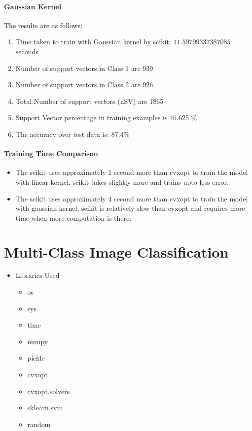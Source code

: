 \documentclass[11pt]{article}
\begin{document}
\paragraph{Gaussian Kernel}
The results are as follows:
\begin{enumerate}
  \item Time taken to train with Gaussian kernel by scikit:  $11.59799337387085$seconds
  \item Number of support vectors in Class 1 are 939
  \item Number of support vectors in Class 2 are 926
  \item Total Number of support vectors (nSV) are  1865
  \item Support Vector percentage in training examples is  46.625 $\%$
  \item The accuracy over test data is:  $87.4 \%$
\end{enumerate}

\paragraph{Training Time Comparison}
    \begin{itemize}
        \item The scikit uses approximately 1 second more than cvxopt to train the model with linear kernel, scikit takes slightly more and trains upto less error.
        \item The scikit uses approximately 4 second more than cvxopt to train the model with gaussian kernel, scikit is relatively slow than cvxopt and requires more time when more computation is there.
    \end{itemize}
\section{Multi-Class Image Classification}
\begin{itemize}
    \item \large Libraries Used
    \begin{itemize}
        \item[\ding{227}] os
        \item[\ding{227}] sys
        \item[\ding{227}] time
        \item[\ding{227}] numpy
        \item[\ding{227}] pickle
        \item[\ding{227}] cvxopt
        \item[\ding{227}] cvxopt.solvers
        \item[\ding{227}] sklearn.svm
        \item[\ding{227}] random
    \end{itemize}
\end{itemize}
\end{document}
